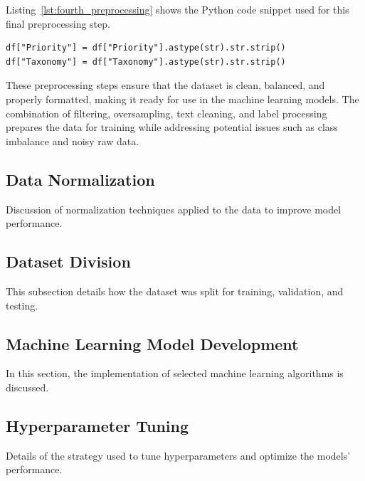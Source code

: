 Listing~\ref{lst:fourth_preprocessing} shows the Python code snippet used for this final preprocessing step.

\vspace{0.2cm}
\noindent
\begin{minipage}{\linewidth}
\begin{verbatim}
df["Priority"] = df["Priority"].astype(str).str.strip()
df["Taxonomy"] = df["Taxonomy"].astype(str).str.strip()
\end{verbatim}
\label{lst:fourth_preprocessing}
\end{minipage}
\vspace{0.1cm}

These preprocessing steps ensure that the dataset is clean, balanced, and properly formatted, making it ready for use in the machine learning models. 
The combination of filtering, oversampling, text cleaning, and label processing prepares the data for training while addressing potential issues such as class imbalance and noisy raw data.

\subsection{Data Normalization}
Discussion of normalization techniques applied to the data to improve model performance.

\subsection{Dataset Division}
This subsection details how the dataset was split for training, validation, and testing.

\subsection{Machine Learning Model Development}
In this section, the implementation of selected machine learning algorithms is discussed.

\subsection{Hyperparameter Tuning}
Details of the strategy used to tune hyperparameters and optimize the models' performance.
